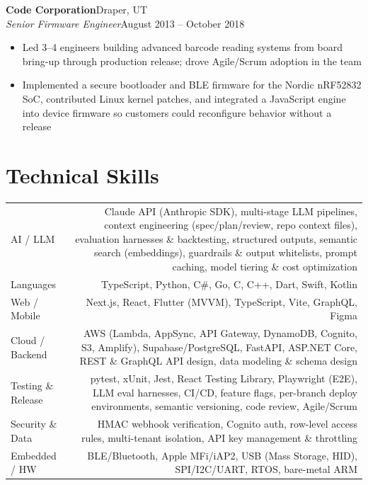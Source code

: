 \documentclass[10.5pt, letterpaper]{article}
\newcommand{\jobentry}[4]{%
  \noindent
  \textbf{\color{accent}#1}\hfill\textcolor{muted}{\small #2}\\
  \textit{#3}\hfill\textcolor{muted}{\small #4}%
}
\begin{document}
\vspace{3pt}

\jobentry{Code Corporation}{Draper, UT}{Senior Firmware Engineer}{August 2013 -- October 2018}
\begin{itemize}
  \item Led 3--4 engineers building advanced barcode reading systems from board
        bring-up through production release; drove Agile/Scrum adoption in the team
  \item Implemented a secure bootloader and BLE firmware for the Nordic nRF52832 SoC,
        contributed Linux kernel patches, and integrated a JavaScript engine into
        device firmware so customers could reconfigure behavior without a release
\end{itemize}

\section{Technical Skills}

\begin{tabularx}{\linewidth}{@{}LR@{}}
  AI / LLM            & Claude API (Anthropic SDK), multi-stage LLM pipelines, context
                        engineering (spec/plan/review, repo context files), evaluation
                        harnesses \& backtesting, structured outputs, semantic search
                        (embeddings), guardrails \& output whitelists, prompt caching,
                        model tiering \& cost optimization \\[3pt]
  Languages           & TypeScript, Python, C\#, Go, C, C++, Dart, Swift, Kotlin \\[3pt]
  Web / Mobile        & Next.js, React, Flutter (MVVM), TypeScript, Vite, GraphQL, Figma \\[3pt]
  Cloud / Backend     & AWS (Lambda, AppSync, API Gateway, DynamoDB, Cognito, S3,
                        Amplify), Supabase/PostgreSQL, FastAPI, ASP.NET Core, REST \&
                        GraphQL API design, data modeling \& schema design \\[3pt]
  Testing \& Release  & pytest, xUnit, Jest, React Testing Library, Playwright (E2E),
                        LLM eval harnesses, CI/CD, feature flags, per-branch deploy
                        environments, semantic versioning, code review, Agile/Scrum \\[3pt]
  Security \& Data    & HMAC webhook verification, Cognito auth, row-level access
                        rules, multi-tenant isolation, API key management \& throttling \\[3pt]
  Embedded / HW       & BLE/Bluetooth, Apple MFi/iAP2, USB (Mass Storage, HID),
                        SPI/I2C/UART, RTOS, bare-metal ARM \\[3pt]
\end{tabularx}
\end{document}
